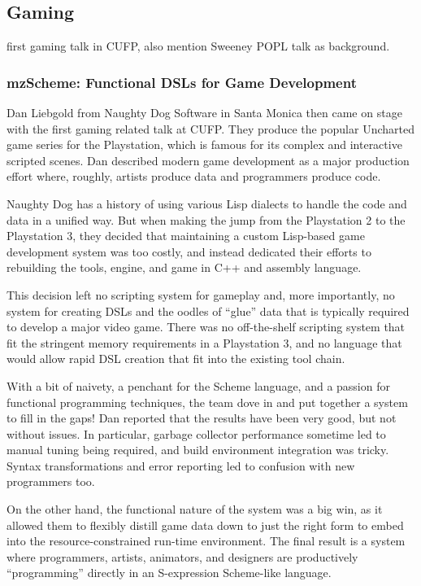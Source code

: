 \documentclass{jfp1}
\begin{document}
\subsection{Gaming}

first gaming talk in CUFP, also mention Sweeney POPL talk as background.

\subsubsection{mzScheme: Functional DSLs for Game Development}

Dan Liebgold from Naughty Dog Software in Santa Monica then came on stage with
the first gaming related talk at CUFP. They produce the popular Uncharted game
series for the Playstation, which is famous for its complex and interactive
scripted scenes.  Dan described modern game development as a major production 
effort where, roughly, artists produce data and programmers produce code.

Naughty Dog has a history of using various Lisp dialects to handle the code and
data in a unified way. But when making the jump from the Playstation 2 to the
Playstation 3, they decided that maintaining a custom Lisp-based game
development system was too costly, and instead dedicated their efforts to
rebuilding the tools, engine, and game in C++ and assembly language.

This decision left no scripting system for gameplay and, more importantly, no
system for creating DSLs and the oodles of “glue” data that is typically
required to develop a major video game. There was no off-the-shelf scripting
system that fit the stringent memory requirements in a Playstation 3, and no
language that would allow rapid DSL creation that fit into the existing tool
chain.

With a bit of naivety, a penchant for the Scheme language, and a passion for
functional programming techniques, the team dove in and put together a system
to fill in the gaps!  Dan reported that the results have been very good, but
not without issues.  In particular, garbage collector performance sometime
led to manual tuning being required, and build environment integration was
tricky. Syntax transformations and error reporting led to confusion with new
programmers too. 

On the other hand, the functional nature of the system was a big win, as it
allowed them to flexibly distill game data down to just the right form to embed
into the resource-constrained run-time environment.  The final result is a
system where programmers, artists, animators, and designers are productively
``programming'' directly in an S-expression Scheme-like language.
\end{document}
